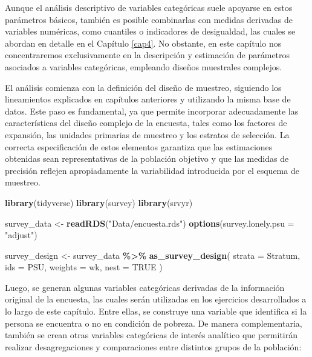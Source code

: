 \documentclass[
  spanish,
  12pt,
]{book}
\newenvironment{Shaded}{\begin{snugshade}}{\end{snugshade}}
\newcommand{\AttributeTok}[1]{\textcolor[rgb]{0.13,0.29,0.53}{#1}}
\newcommand{\ConstantTok}[1]{\textcolor[rgb]{0.56,0.35,0.01}{#1}}
\newcommand{\FunctionTok}[1]{\textcolor[rgb]{0.13,0.29,0.53}{\textbf{#1}}}
\newcommand{\NormalTok}[1]{#1}
\newcommand{\OtherTok}[1]{\textcolor[rgb]{0.56,0.35,0.01}{#1}}
\newcommand{\SpecialCharTok}[1]{\textcolor[rgb]{0.81,0.36,0.00}{\textbf{#1}}}
\newcommand{\StringTok}[1]{\textcolor[rgb]{0.31,0.60,0.02}{#1}}
\begin{document}
Aunque el análisis descriptivo de variables categóricas suele apoyarse en estos parámetros básicos, también es posible combinarlas con medidas derivadas de variables numéricas, como cuantiles o indicadores de desigualdad, las cuales se abordan en detalle en el Capítulo \ref{cap4}. No obstante, en este capítulo nos concentraremos exclusivamente en la descripción y estimación de parámetros asociados a variables categóricas, empleando diseños muestrales complejos.

El análisis comienza con la definición del diseño de muestreo, siguiendo los lineamientos explicados en capítulos anteriores y utilizando la misma base de datos. Este paso es fundamental, ya que permite incorporar adecuadamente las características del diseño complejo de la encuesta, tales como los factores de expansión, las unidades primarias de muestreo y los estratos de selección. La correcta especificación de estos elementos garantiza que las estimaciones obtenidas sean representativas de la población objetivo y que las medidas de precisión reflejen apropiadamente la variabilidad introducida por el esquema de muestreo.

\begin{Shaded}
\begin{Highlighting}[]
\FunctionTok{library}\NormalTok{(tidyverse)}
\FunctionTok{library}\NormalTok{(survey)}
\FunctionTok{library}\NormalTok{(srvyr)}

\NormalTok{survey\_data }\OtherTok{\textless{}{-}} \FunctionTok{readRDS}\NormalTok{(}\StringTok{"Data/encuesta.rds"}\NormalTok{)}
\FunctionTok{options}\NormalTok{(}\AttributeTok{survey.lonely.psu =} \StringTok{"adjust"}\NormalTok{)}

\NormalTok{survey\_design }\OtherTok{\textless{}{-}}\NormalTok{ survey\_data }\SpecialCharTok{\%\textgreater{}\%}
  \FunctionTok{as\_survey\_design}\NormalTok{(}
    \AttributeTok{strata =}\NormalTok{ Stratum,}
    \AttributeTok{ids =}\NormalTok{ PSU,}
    \AttributeTok{weights =}\NormalTok{ wk,}
    \AttributeTok{nest =} \ConstantTok{TRUE}
\NormalTok{  )}
\end{Highlighting}
\end{Shaded}

Luego, se generan algunas variables categóricas derivadas de la información original de la encuesta, las cuales serán utilizadas en los ejercicios desarrollados a lo largo de este capítulo. Entre ellas, se construye una variable que identifica si la persona se encuentra o no en condición de pobreza. De manera complementaria, también se crean otras variables categóricas de interés analítico que permitirán realizar desagregaciones y comparaciones entre distintos grupos de la población:
\end{document}
